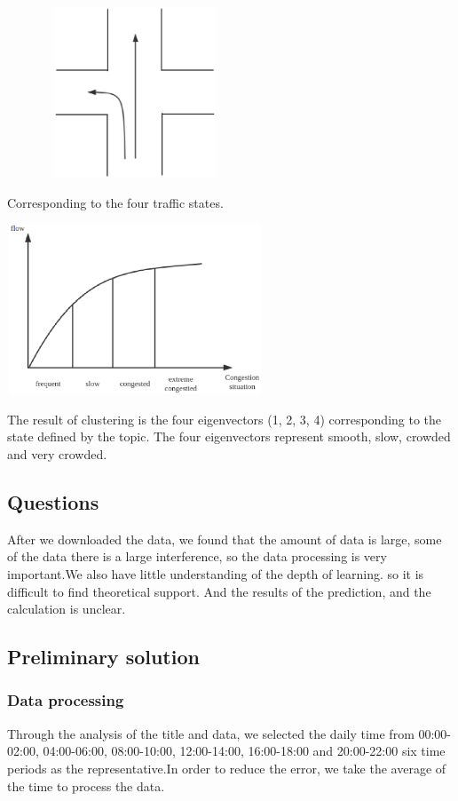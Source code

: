 \documentclass[conference,compsoc]{report}
\begin{document}
\includegraphics[width=3.00in,height=2.00in]{crossroads.eps}

Corresponding to the four traffic states.

\includegraphics[width=3.00in,height=2.00in]{states.eps}

The result of clustering is the four eigenvectors (1, 2, 3, 4) corresponding to the state defined by the topic. The four eigenvectors represent smooth, slow, crowded and very crowded.

\subsection{Questions}
After we downloaded the data, we found that the amount of data is large, some of the data there is a large interference, so the data processing is very important.We also have little understanding of the depth of learning. so it is difficult to find theoretical support.
And the results of the prediction, and the calculation is unclear.


\subsection{Preliminary solution}
\subsubsection{Data processing}
Through the analysis of the title and data, we selected the daily time from 00:00-02:00, 04:00-06:00, 08:00-10:00, 12:00-14:00, 16:00-18:00 and 20:00-22:00 six time periods as the representative.In order to reduce the error, we take the average of the time to process the data.
\end{document}
